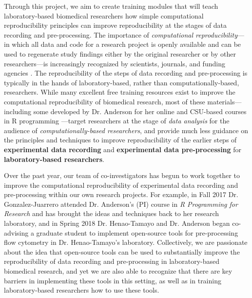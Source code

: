 \documentclass[pdftex,english,11pt,parskip=half]{scrartcl}
\begin{document}
Through this project, we aim to create training modules that will teach laboratory-based biomedical
researchers how simple computational reproducibility principles can improve
reproducibility at the stages of data recording and
pre-processing. The importance of \textit{computational reproducibility}---in which all
data and code for a research project is openly available and can be used to regenerate study findings either by the original researcher or by
other researchers---is increasingly recognized by scientists, journals, and funding
agencies \cite{ellis2018share, ram2013git}. The reproducibility of the steps of data recording and pre-processing is typically 
in the hands of laboratory-based, rather than computationally-based, researchers.
While many excellent free training resources exist to improve the computational
reproducibility of biomedical research, most of these
materials---including some developed by Dr. Anderson for her online and
CSU-based courses in R programming \cite{andersoncoursebook, andersonmastering}---target researchers at the stage of
\textit{data analysis} for the audience of \textit{computationally-based researchers}, and provide much less guidance on the principles and
techniques to improve reproducibility of the earlier steps of
\textbf{experimental data recording} and \textbf{experimental data
pre-processing} for \textbf{laboratory-based researchers}. 

Over the past year, our team of co-investigators has begun
to work together to improve the computational reproducibility of experimental data recording and pre-processing within our own research projects. For example, in
Fall 2017 Dr. Gonzalez-Juarrero attended Dr. Anderson's (PI) course in \textit{R
Programming for Research} and has brought the ideas and techniques back to her
research laboratory, and in Spring 2018 Dr. Henao-Tamayo and Dr.
Anderson began co-advising a graduate student to implement
open-source tools for pre-processing flow cytometry in Dr. Henao-Tamayo's
laboratory. Collectively, we are passionate about the idea that
open-source tools can be used to substantially improve the
reproducibility of data recording and pre-processing in laboratory-based
biomedical research, and yet we are also able to recognize that there are key barriers in
implementing these tools in this setting, as well as in training
laboratory-based researchers how to use these tools. 
\end{document}
